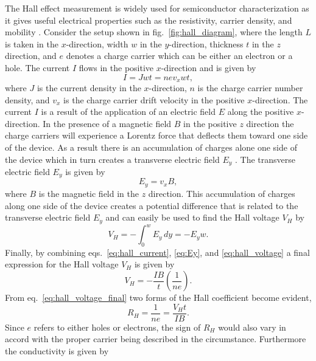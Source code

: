 \noindent The Hall effect measurement is widely used for semiconductor characterization as it gives useful electrical properties such as the resistivity, carrier density, and mobility \cite{Schroder_Semiconductor2006}. Consider the setup shown in fig.~\ref{fig:hall_diagram}, where the length $L$ is taken in the $x$-direction, width $w$ in the $y$-direction, thickness $t$ in the $z$ direction, and $e$ denotes a charge carrier which can be either an electron or a hole. The current $I$ flows in the positive $x$-direction and is given by 
\begin{equation}\label{eq:hall_current}
	I = J w t = n e v_x w t,
\end{equation}
where $J$ is the current density in the $x$-direction, $n$ is the charge carrier number density, and $v_x$ is the charge carrier drift velocity in the positive $x$-direction. The current $I$ is a result of the application of an electric field $E$ along the positive $x$-direction. In the presence of a magnetic field $B$ in the positive $z$ direction the charge carriers will experience a Lorentz force that deflects them toward one side of the device. As a result there is an accumulation of charges alone one side of the device which in turn creates a transverse electric field $E_y$ \cite{Melissinos_Experiments1966}. The transverse electric field $E_y$ is given by
\begin{equation}\label{eq:Ey}
	E_y = v_x B,
\end{equation}
where $B$ is the magnetic field in the $z$ direction. This accumulation of charges along one side of the device creates a potential difference that is related to the transverse electric field $E_y$ and can easily be used to find the Hall voltage $V_H$ by
\begin{equation}\label{eq:hall_voltage}
	V_H = -\int_0^w E_y\,dy = - E_y w.
\end{equation}
Finally, by combining eqs.~\ref{eq:hall_current}, \ref{eq:Ey}, and \ref{eq:hall_voltage} a final expression for the Hall voltage $V_H$ is given by
\begin{equation}\label{eq:hall_voltage_final}
	V_H = -\frac{I B}{t}\left(\frac{1}{ne}\right).
\end{equation}
From eq.~\ref{eq:hall_voltage_final} two forms of the Hall coefficient become evident,
\begin{equation}\label{eq:RH}
	R_H = \frac{1}{ne} = \frac{V_H t}{I B}.
\end{equation}
Since $e$ refers to either holes or electrons, the sign of $R_H$ would also vary in accord with the proper carrier being described in the circumstance. Furthermore the conductivity is given by 
